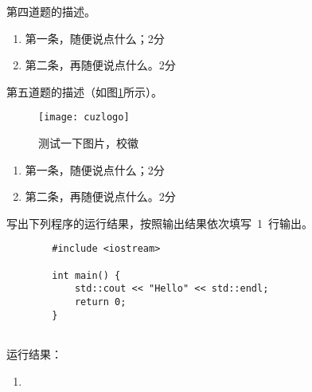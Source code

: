 \documentclass[answer]{cuzexam} %
\begin{document}
\begin{problem}
    第四道题的描述。
\end{problem}

\begin{solution}
    \begin{enumerate}[label=(\arabic*)]
        \item 第一条，随便说点什么；\dotfill 2分
        \item 第二条，再随便说点什么。\dotfill 2分
    \end{enumerate}
\end{solution}

\begin{studentanswer}
    \vspace{28ex}
\end{studentanswer}

\begin{problem}
    第五道题的描述（如图\ref{fig:1}所示）。
    \begin{figure}[h]
        \centering
        \texttt{[image: cuzlogo]}
        \caption[校徽]{测试一下图片，校徽}
        \label{fig:1}
    \end{figure}
\end{problem}

\begin{solution}
    \begin{enumerate}[label=(\arabic*)]
        \item 第一条，随便说点什么；\dotfill 2分
        \item 第二条，再随便说点什么。\dotfill 2分
    \end{enumerate}
\end{solution}

\begin{studentanswer}
    \vspace{28ex}
\end{studentanswer}


\begin{problem}
    写出下列程序的运行结果，按照输出结果依次填写~1~行输出。
    \begin{verbatim}
        #include <iostream>
        
        int main() {
            std::cout << "Hello" << std::endl;
            return 0;
        }
        
    \end{verbatim}
    运行结果：
    \begin{enumerate}[label=(\arabic*),series=cuzafter]
        \item {}
    \end{enumerate}
\end{problem}
\end{document}
